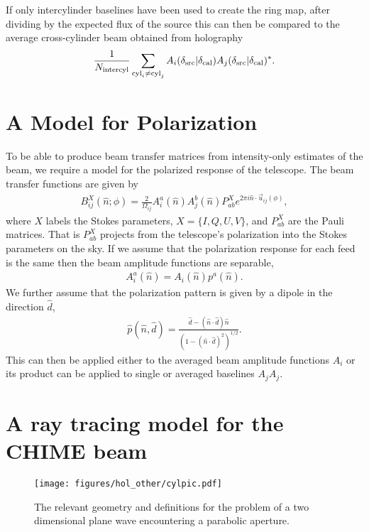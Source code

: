 If only intercylinder baselines have been used to create the ring map, after dividing by the expected flux of the source this can then be compared to the average cross-cylinder beam obtained from holography
\begin{equation}
\frac{1}{N_{\rm intercyl}}\sum_{{\rm cyl}_i \ne{\rm cyl}_j}  A_i(\delta_{\rm src} | \delta_{\rm cal})A_j(\delta_{\rm src} | \delta_{\rm cal})^*.
\end{equation}

\section{A Model for Polarization}
\label{app:hol:sec:polmodel}

To be able to produce beam transfer matrices from intensity-only estimates of the beam, we require a model for the polarized response of the telescope. The beam transfer functions are given by
\begin{align}
B^X_{ij}(\hat{n}; \phi) = \frac{2}{\Omega_{ij}} A^a_i(\hat{n}) A^b_j(\hat{n}) P_{ab}^X e^{2\pi i \hat{n}\cdot\vec{u}_{ij}(\phi)},
\end{align}
where $X$ labels the Stokes parameters, $X=\{I, Q, U, V\}$, and $P_{ab}^X$ are the Pauli matrices. That is $P_{ab}^X$ projects from the telescope's polarization into the Stokes parameters on the sky. If we assume that the polarization response for each feed is the same then the beam amplitude functions are separable,
\begin{align}
A^a_i(\hat{n}) = A_i(\hat{n})p^a(\hat{n}).
\end{align}
We further assume that the polarization pattern is given by a dipole in the direction $\hat{d}$,
\begin{align}
\hat{p}(\hat{n}, \hat{d}) =\frac{\hat{d} - (\hat{n}\cdot\hat{d}) \hat{n}}{(1 - (\hat{n}\cdot\hat{d})^2)^{1/2}}.
\end{align}
This can then be applied either to the averaged beam amplitude functions $A_i$  or its product can be applied to single or averaged baselines $A_jA_j$.

\section{A ray tracing model for the CHIME beam}
\label{app:hol:sec:model}

\begin{figure}[h!]
\begin{center}
\texttt{[image: figures/hol\_other/cylpic.pdf]}
\caption{The relevant geometry and definitions for the problem of a two dimensional plane wave encountering a parabolic aperture.}
\label{cylpic}
\end{center}
\end{figure}

